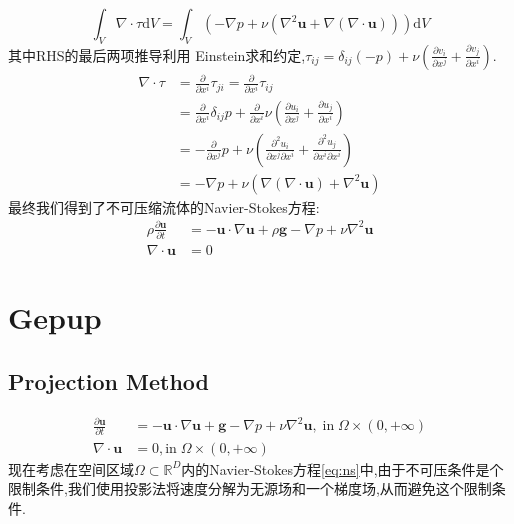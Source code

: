 \documentclass[12pt,halfline,a4paper]{ouparticle}
\begin{document}
\newline
$$\int_{V} \nabla \cdot \tau \text{d} V = \int_V (-\nabla p + \nu ( \nabla^2 \boldsymbol{u} + \nabla (\nabla \cdot \boldsymbol{u})) )\text{d} V$$
\newline
其中RHS的最后两项推导利用
Einstein求和约定,$\tau_{ij} = \delta_{ij}(-p) + \nu(\frac{\partial v_i}{\partial x^j}+\frac{\partial v_j}{\partial x^i})$.
\begin{equation*}
\begin{aligned} 
    \nabla \cdot \tau  &= \frac{\partial}{\partial x^i}\tau_{ji} = \frac{\partial}{\partial x^i}\tau_{ij}  \\
    &= \frac{\partial}{\partial x^i} \delta_{ij}p + \frac{\partial}{\partial x^i}\nu(\frac{\partial u_i}{\partial x^j}+\frac{\partial u_j}{\partial x^i}) \\
    &= -\frac{\partial}{\partial x^j}p + \nu(\frac{\partial^2 u_i}{\partial x^j \partial x^i} + \frac{\partial^2 u_j}{\partial x^i \partial x^i}) \\
    &= -\nabla p + \nu(\nabla (\nabla \cdot \boldsymbol{u}) + \nabla^2 \boldsymbol{u} )
\end{aligned}
\end{equation*}
最终我们得到了不可压缩流体的Navier-Stokes方程:
\begin{equation*}
\begin{aligned}
    \rho  \frac{\partial \boldsymbol{u} }{\partial t} &= -\boldsymbol{u} \cdot \nabla \boldsymbol{u}  + \rho \mathbf{g} -\nabla p + \nu \nabla^2 \boldsymbol{u} \\
    \nabla \cdot \boldsymbol{u} &= 0
\end{aligned}
\end{equation*}
\section{Gepup}
\subsection{Projection Method}
\begin{equation}\label{eq:ns}
    \begin{aligned}
        \frac{\partial \boldsymbol{u} }{\partial t}&= -\boldsymbol{u} \cdot \nabla \boldsymbol{u}  + \mathbf{g} -\nabla p + \nu \nabla^2 \boldsymbol{u},\; \text{in}\; \Omega \times (0,+\infty)\\
        \nabla \cdot \boldsymbol{u} &= 0, \text{in} \;\Omega \times (0,+\infty)
    \end{aligned}
    \end{equation}
现在考虑在空间区域$\Omega \subset \mathbb{R}^D$内的Navier-Stokes方程\eqref{eq:ns}中,由于不可压条件是个限制条件,我们使用投影法将速度分解为无源场和一个梯度场,从而避免这个限制条件.
\end{document}
